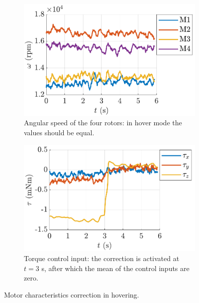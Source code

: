 \begin{figure}[!h]
  \centering
  \begin{subfigure}[t]{.45\textwidth}
    \centering
    \includegraphics[width=\linewidth]{Fig/motor_offset_2.pdf}
  \caption{Angular speed of the four rotors: in hover mode the values should be equal. }\label{fig:motors2}
  \end{subfigure}
  \hspace{1cm}
  \begin{subfigure}[t]{.45\textwidth}
    \centering
    \includegraphics[width=\linewidth]{Fig/motor_offset.pdf}
  \caption{Torque control input: the correction is activated at $t=3$ s, after which the mean of the control inputs are zero.}\label{fig:motors}
  \end{subfigure}%
  \caption{Motor characteristics correction in hovering.}
  \label{fig:motor}
  \end{figure}

